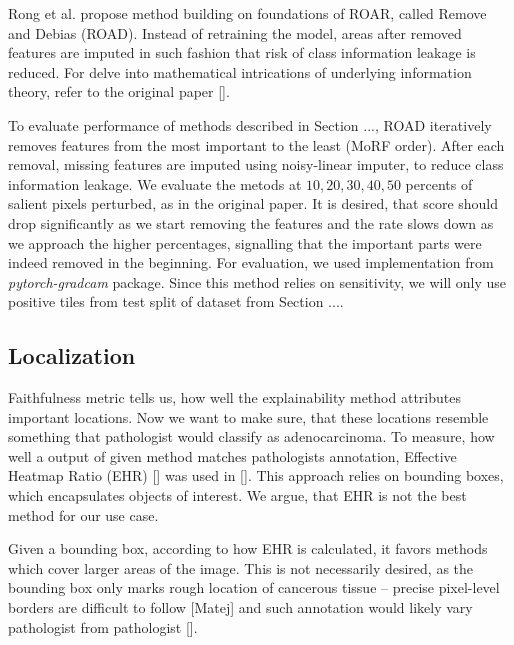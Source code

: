 Rong et al. propose method building on foundations of ROAR, called Remove and Debias (ROAD). Instead of retraining the model, areas after removed features are imputed in such fashion that risk of class information leakage is reduced. For delve into mathematical intrications of underlying information theory, refer to the original paper [].\newline

\noindent
To evaluate performance of methods described in Section ..., ROAD iteratively removes features from the most important to the least (MoRF order). After each removal, missing features are imputed using noisy-linear imputer, to reduce class information leakage. We evaluate the metods at $10, 20, 30, 40, 50$ percents of salient pixels perturbed, as in the original paper. It is desired, that score should drop significantly as we start removing the features and the rate slows down as we approach the higher percentages, signalling that the important parts were indeed removed in the beginning. For evaluation, we used implementation from \emph{pytorch-gradcam} package. Since this method relies on sensitivity, we will only use positive tiles from test split of dataset from Section ....


\subsection*{Localization}
Faithfulness metric tells us, how well the explainability method attributes important locations. Now we want to make sure, that these locations resemble something that pathologist would classify as adenocarcinoma. To measure, how well a output of given method matches pathologists annotation, Effective Heatmap Ratio (EHR) [] was used in []. This approach relies on bounding boxes, which encapsulates objects of interest. We argue, that EHR is not the best method for our use case.

Given a bounding box, according to how EHR is calculated, it favors methods which cover larger areas of the image. This is not necessarily desired, as the bounding box only marks rough location of cancerous tissue -- precise pixel-level borders are difficult to follow [Matej] and such annotation would likely vary pathologist from pathologist [].


